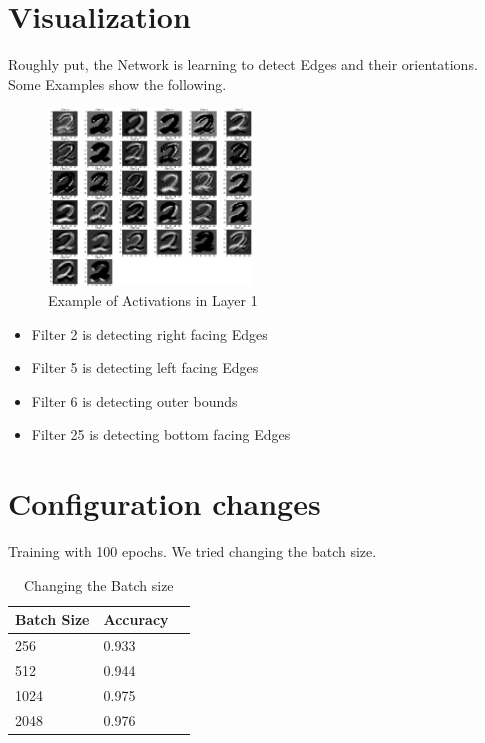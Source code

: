 \documentclass[twoside, twocolumn]{article}
\begin{document}
\section{Visualization}
Roughly put, the Network is learning to detect Edges and their orientations.\\
Some Examples show the following.\\
\begin{figure}[htb]
\centering
	\includegraphics[width=0.48\textwidth]{activations.png}
	\caption{Example of Activations in Layer 1}
\end{figure}
\begin{itemize}
 \item Filter 2 is detecting right facing Edges
 \item Filter 5 is detecting left facing Edges
 \item Filter 6 is detecting outer bounds
 \item Filter 25 is detecting bottom facing Edges
\end{itemize}






\section{Configuration changes}

Training with 100 epochs. We tried changing the batch size.

\begin{table}[htb]
\label{table_batch}
	\caption{Changing the Batch size}
	\centering
		\begin{tabular}{l l l}
			Batch Size & Accuracy \\
			\midrule
			256 & 0.933\\
			512 & 0.944\\
			1024 & 0.975\\
			2048 & 0.976\\
\end{tabular}
\end{table}
\end{document}
